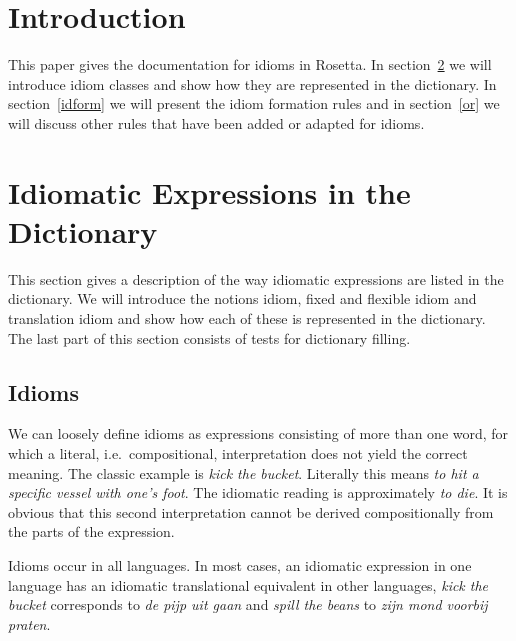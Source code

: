 

   \RosDate{\today}
   \RosSupersedes{-}
   \MakeRosTitle
%
%



\section{Introduction}
This paper gives the documentation for idioms in Rosetta. 
In section~\ref{idiom} we will introduce idiom classes and show how they are 
represented in the dictionary. In section~\ref{idform} we will present the 
idiom formation rules and in section~\ref{or} we will discuss other rules that 
have been added or adapted for idioms.

\section{Idiomatic Expressions in the Dictionary}
\label{idiom}
This section gives a description of the way idiomatic expressions are listed in
the dictionary. We will introduce the notions idiom, fixed and flexible idiom 
and translation idiom and show how each of these is represented in the 
dictionary. The last part of this section consists of tests for dictionary 
filling.

\subsection{Idioms}

We can loosely define idioms as expressions consisting of more than one word,
for which a literal, i.e.\ compositional, interpretation does not yield the
correct meaning. The classic example is {\em kick the bucket}. Literally this
means {\em to hit a specific vessel with one's foot}. The idiomatic reading is
approximately {\em to die}. It is obvious that this second interpretation
cannot be derived compositionally from the parts of the expression. 

Idioms occur in all languages. In most cases, an idiomatic expression in one
language has an idiomatic translational equivalent in other languages, {\em
kick the bucket} corresponds to {\em de pijp uit gaan} and {\em spill the
beans} to {\em zijn mond voorbij praten}. 

